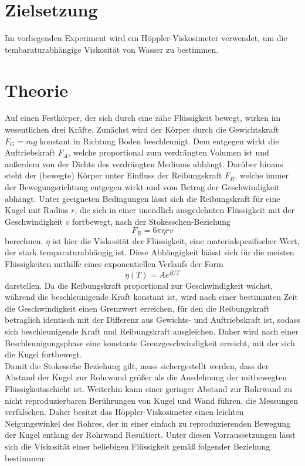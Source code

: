 \section{Zielsetzung}
\label{sec:zielsetzung}
Im vorliegenden Experiment wird ein Höppler-Viskosimeter verwendet, um die  tembaraturabhängige Viskosität von Wasser zu bestimmen.
\section{Theorie}
\label{sec:theorie}
Auf einen Festkörper, der sich durch eine zähe Flüssigkeit bewegt, wirken im wesentlichen drei Kräfte. Zunächst wird der Körper durch die Gewichtskraft $F_G=mg$ konstant in Richtung Boden beschleunigt. Dem entgegen wirkt die Auftriebskraft $F_A$, welche proportional zum verdrängten Volumen ist und außerdem von der Dichte des verdrängten Mediums abhängt. Darüber hinaus steht der (bewegte) Körper unter Einfluss der Reibungskraft $F_R$, welche immer der Bewegungsrichtung entgegen wirkt und vom Betrag der Geschwindigkeit abhängt. Unter geeigneten Bedingungen lässt sich die Reibungskraft für eine Kugel mit Radius $r$, die sich in einer unendlich ausgedehnten Flüssigkeit mit der Geschwindigkeit $v$ fortbewegt, nach der Stokesschen-Beziehung
\begin{equation}
F_R=6\pi \eta rv
\end{equation}
berechnen. $\eta$ ist hier die Viskosität der Flüssigkeit, eine materialspezifischer Wert, der stark temparaturabhängig ist. Diese Abhängigkeit läässt sich für die meisten Flüssigkeiten mithilfe eines exponentiellen Verlaufs der Form
\begin{equation}
\eta (T) = Ae^{B/T}
\end{equation}
darstellen. Da die Reibungskraft proportional zur Geschwindigkeit wächst, während die beschleunigende Kraft konstant ist, wird nach einer bestimmten Zeit die Geschwindigkeit einen Grenzwert erreichen, für den die Reibungskraft betraglich identisch mit der Differenz aus Gewichts- und Auftriebskraft ist, sodass sich beschleunigende Kraft und Reibungskraft ausgleichen. Daher wird nach einer Beschleunigungsphase eine konstante Grenzgeschwindigkeit erreicht, mit der sich die Kugel fortbewegt. \\
Damit die Stokessche Beziehung gilt, muss sichergestellt werden, dass der Abstand der Kugel zur Rohrwand größer als die Ausdehnung der mitbewegten Flüssigkeitsschicht ist. Weiterhin kann einer geringer Abstand zur Rohrwand zu nicht reproduzierbaren Berührungen von Kugel und Wand führen, die Messungen verfälschen. Daher besitzt das Höppler-Viskosimeter einen leichten Neigungswinkel des Rohres, der in einer einfach zu reproduzierenden Bewegung der Kugel entlang der Rohrwand Resultiert. Unter diesen Vorraussetzungen lässt sich die Viskosität einer beliebigen Flüssigkeit gemäß folgender Beziehung bestimmen:

